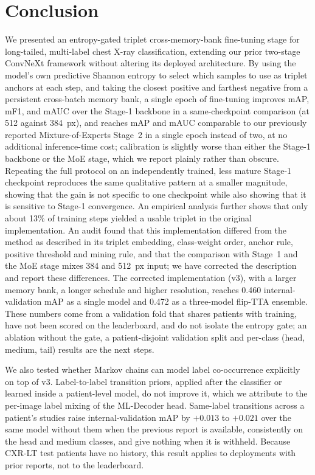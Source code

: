 \documentclass[conference]{IEEEtran}
\begin{document}
\section{Conclusion}
We presented an entropy-gated triplet cross-memory-bank fine-tuning stage for long-tailed, multi-label chest X-ray classification, extending our prior two-stage ConvNeXt framework without altering its deployed architecture. By using the model's own predictive Shannon entropy to select which samples to use as triplet anchors at each step, and taking the closest positive and farthest negative from a persistent cross-batch memory bank, a single epoch of fine-tuning improves mAP, mF1, and mAUC over the Stage-1 backbone in a same-checkpoint comparison (at 512 against 384~px), and reaches mAP and mAUC comparable to our previously reported Mixture-of-Experts Stage~2 in a single epoch instead of two, at no additional inference-time cost; calibration is slightly worse than either the Stage-1 backbone or the MoE stage, which we report plainly rather than obscure. Repeating the full protocol on an independently trained, less mature Stage-1 checkpoint reproduces the same qualitative pattern at a smaller magnitude, showing that the gain is not specific to one checkpoint while also showing that it is sensitive to Stage-1 convergence. An empirical analysis further shows that only about 13\% of training steps yielded a usable triplet in the original implementation. An audit found that this implementation differed from the method as described in its triplet embedding, class-weight order, anchor rule, positive threshold and mining rule, and that the comparison with Stage~1 and the MoE stage mixes 384 and 512~px input; we have corrected the description and report these differences. The corrected implementation (v3), with a larger memory bank, a longer schedule and higher resolution, reaches 0.460 internal-validation mAP as a single model and 0.472 as a three-model flip-TTA ensemble. These numbers come from a validation fold that shares patients with training, have not been scored on the leaderboard, and do not isolate the entropy gate; an ablation without the gate, a patient-disjoint validation split and per-class (head, medium, tail) results are the next steps.

We also tested whether Markov chains can model label co-occurrence explicitly on top of v3. Label-to-label transition priors, applied after the classifier or learned inside a patient-level model, do not improve it, which we attribute to the per-image label mixing of the ML-Decoder head. Same-label transitions across a patient's studies raise internal-validation mAP by $+0.013$ to $+0.021$ over the same model without them when the previous report is available, consistently on the head and medium classes, and give nothing when it is withheld. Because CXR-LT test patients have no history, this result applies to deployments with prior reports, not to the leaderboard.
\end{document}

